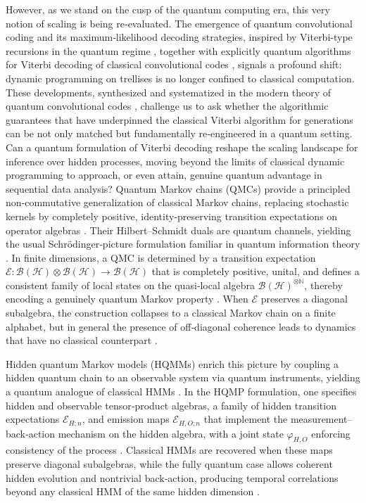 \documentclass[12pt, reco]{article}
\begin{document}
However, as we stand on the cusp of the quantum computing era, this very notion of scaling is being re‑evaluated. The emergence of quantum convolutional coding and its maximum‑likelihood decoding strategies, inspired by Viterbi‑type recursions in the quantum regime \cite{OllivierTillichPRL2003, OllivierTillich2006, TanLi2010}, together with explicitly quantum algorithms for Viterbi decoding of classical convolutional codes \cite{GriceMeyer2015}, signals a profound shift: dynamic programming on trellises is no longer confined to classical computation. These developments, synthesized and systematized in the modern theory of quantum convolutional codes \cite{WildeQECBook2013}, challenge us to ask whether the algorithmic guarantees that have underpinned the classical Viterbi algorithm for generations can be not only matched but fundamentally re‑engineered in a quantum setting. Can a quantum formulation of Viterbi decoding reshape the scaling landscape for inference over hidden processes, moving beyond the limits of classical dynamic programming to approach, or even attain, genuine quantum advantage in sequential data analysis?
Quantum Markov chains (QMCs) provide a principled non‑commutative generalization of classical Markov chains, replacing stochastic kernels by completely positive, identity‑preserving transition expectations on operator algebras \cite{accardi1974,ASS20,Ib08}. Their Hilbert–Schmidt duals are quantum channels, yielding the usual Schrödinger‑picture formulation familiar in quantum information theory \cite{FR15,D18,Ib08}. In finite dimensions, a QMC is determined by a transition expectation \(\mathcal{E}:\mathcal{B}(\mathcal{H})\otimes\mathcal{B}(\mathcal{H})\to\mathcal{B}(\mathcal{H})\) that is completely positive, unital, and defines a consistent family of local states on the quasi‑local algebra \(\mathcal{B}(\mathcal{H})^{\otimes\mathbb{N}}\), thereby encoding a genuinely quantum Markov property \cite{ASS20}. When \(\mathcal{E}\) preserves a diagonal subalgebra, the construction collapses to a classical Markov chain on a finite alphabet, but in general the presence of off‑diagonal coherence leads to dynamics that have no classical counterpart \cite{Lu95,ASS20,Ib08}.

Hidden quantum Markov models (HQMMs) enrich this picture by coupling a hidden quantum chain to an observable system via quantum instruments, yielding a quantum analogue of classical HMMs \cite{AGLS24Q,Monras11}. In the HQMP formulation, one specifies hidden and observable tensor‑product algebras, a family of hidden transition expectations \(\mathcal{E}_{H;n}\), and emission maps \(\mathcal{E}_{H,O;n}\) that implement the measurement–back‑action mechanism on the hidden algebra, with a joint state \(\varphi_{H,O}\) enforcing consistency of the process \cite{AGLS24Q}. Classical HMMs are recovered when these maps preserve diagonal subalgebras, while the fully quantum case allows coherent hidden evolution and nontrivial back‑action, producing temporal correlations beyond any classical HMM of the same hidden dimension \cite{AGLS24Q,Monras11}. 
\end{document}
